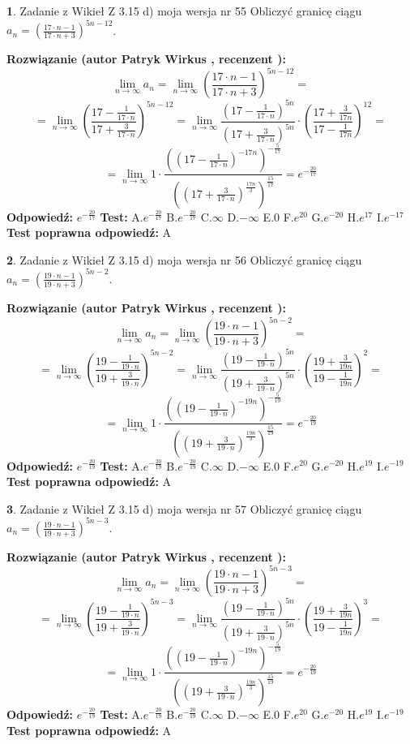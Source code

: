 \documentclass[12pt, a4paper]{article}
\theoremstyle{definition} %
\newtheorem{zad}{}
\newcommand{\zadStart}[1]{\begin{zad}#1\newline}
\newcommand{\zadStop}{\end{zad}}
\newcommand{\rozwStart}[2]{\noindent \textbf{Rozwiązanie (autor #1 , recenzent #2): }\newline}
\newcommand{\rozwStop}{\newline}
\newcommand{\odpStart}{\noindent \textbf{Odpowiedź:}\newline}
\newcommand{\odpStop}{\newline}
\newcommand{\testStart}{\noindent \textbf{Test:}\newline}
\newcommand{\testStop}{\newline}
\newcommand{\kluczStart}{\noindent \textbf{Test poprawna odpowiedź:}\newline}
\newcommand{\kluczStop}{\newline}
\begin{document}
\zadStart{Zadanie z Wikieł Z 3.15 d) moja wersja nr 55}
Obliczyć granicę ciągu $a_{n}=(\frac{17\cdot n - 1}{17 \cdot n + 3})^{5n-12}$.
\zadStop
\rozwStart{Patryk Wirkus}{}
$$\lim\limits_{n\to\infty} a_{n} = \lim\limits_{n\to\infty}(\frac{17\cdot n - 1}{17 \cdot n + 3})^{5n-12}=$$
$$=\lim\limits_{n\to\infty}(\frac{17 - \frac{1}{17\cdot n}}{17 + \frac{3}{17 \cdot n}})^{5n-12}=\lim\limits_{n\to\infty}\frac{(17 - \frac{1}{17\cdot n})^{5n}}{(17 + \frac{3}{17\cdot n})^{5n}} \cdot (\frac{17+\frac{3}{17n}}{17-\frac{1}{17n}})^{12}=$$
$$=\lim\limits_{n\to\infty} 1 \cdot \frac{((17-\frac{1}{17 \cdot n})^{-17n})^{-\frac{5}{17}}}{((17+\frac{3}{17 \cdot n})^{\frac{17n}{3}})^{\frac{15}{17}}} =e^{-\frac{20}{17}}$$
\rozwStop
\odpStart
$e^{-\frac{20}{17}}$
\odpStop
\testStart
A.$ e^{-\frac{20}{17}}$
B.$ e^{-\frac{20}{17}}$
C.$\infty$
D.$-\infty$
E.$0$
F.$e^{20}$
G.$e^{-20}$
H.$e^{17}$
I.$e^{-17}$
\testStop
\kluczStart
A
\kluczStop



\zadStart{Zadanie z Wikieł Z 3.15 d) moja wersja nr 56}
Obliczyć granicę ciągu $a_{n}=(\frac{19\cdot n - 1}{19 \cdot n + 3})^{5n-2}$.
\zadStop
\rozwStart{Patryk Wirkus}{}
$$\lim\limits_{n\to\infty} a_{n} = \lim\limits_{n\to\infty}(\frac{19\cdot n - 1}{19 \cdot n + 3})^{5n-2}=$$
$$=\lim\limits_{n\to\infty}(\frac{19 - \frac{1}{19\cdot n}}{19 + \frac{3}{19 \cdot n}})^{5n-2}=\lim\limits_{n\to\infty}\frac{(19 - \frac{1}{19\cdot n})^{5n}}{(19 + \frac{3}{19\cdot n})^{5n}} \cdot (\frac{19+\frac{3}{19n}}{19-\frac{1}{19n}})^{2}=$$
$$=\lim\limits_{n\to\infty} 1 \cdot \frac{((19-\frac{1}{19 \cdot n})^{-19n})^{-\frac{5}{19}}}{((19+\frac{3}{19 \cdot n})^{\frac{19n}{3}})^{\frac{15}{19}}} =e^{-\frac{20}{19}}$$
\rozwStop
\odpStart
$e^{-\frac{20}{19}}$
\odpStop
\testStart
A.$ e^{-\frac{20}{19}}$
B.$ e^{-\frac{20}{19}}$
C.$\infty$
D.$-\infty$
E.$0$
F.$e^{20}$
G.$e^{-20}$
H.$e^{19}$
I.$e^{-19}$
\testStop
\kluczStart
A
\kluczStop



\zadStart{Zadanie z Wikieł Z 3.15 d) moja wersja nr 57}
Obliczyć granicę ciągu $a_{n}=(\frac{19\cdot n - 1}{19 \cdot n + 3})^{5n-3}$.
\zadStop
\rozwStart{Patryk Wirkus}{}
$$\lim\limits_{n\to\infty} a_{n} = \lim\limits_{n\to\infty}(\frac{19\cdot n - 1}{19 \cdot n + 3})^{5n-3}=$$
$$=\lim\limits_{n\to\infty}(\frac{19 - \frac{1}{19\cdot n}}{19 + \frac{3}{19 \cdot n}})^{5n-3}=\lim\limits_{n\to\infty}\frac{(19 - \frac{1}{19\cdot n})^{5n}}{(19 + \frac{3}{19\cdot n})^{5n}} \cdot (\frac{19+\frac{3}{19n}}{19-\frac{1}{19n}})^{3}=$$
$$=\lim\limits_{n\to\infty} 1 \cdot \frac{((19-\frac{1}{19 \cdot n})^{-19n})^{-\frac{5}{19}}}{((19+\frac{3}{19 \cdot n})^{\frac{19n}{3}})^{\frac{15}{19}}} =e^{-\frac{20}{19}}$$
\rozwStop
\odpStart
$e^{-\frac{20}{19}}$
\odpStop
\testStart
A.$ e^{-\frac{20}{19}}$
B.$ e^{-\frac{20}{19}}$
C.$\infty$
D.$-\infty$
E.$0$
F.$e^{20}$
G.$e^{-20}$
H.$e^{19}$
I.$e^{-19}$
\testStop
\kluczStart
A
\kluczStop
\end{document}
